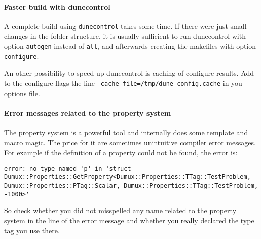\paragraph{Faster build with dunecontrol}
A complete build using \texttt{dunecontrol} takes some time. If there were just small changes in the folder structure, it is usually sufficient to run dunecontrol with option \texttt{autogen} instead of \texttt{all}, and afterwards creating the makefiles with option \texttt{configure}.

An other possibility to speed up dunecontrol is caching of configure results. Add to the configure flags the line \texttt{--cache-file=/tmp/dune-config.cache} in you options file.

\paragraph{Error messages related to the property system}
The property system is a powerful tool and internally does some template and macro magic. 
The price for it are sometimes unintuitive compiler error messages. For example if the
definition of a property could not be found, the error is:
\begin{lstlisting}[style=DumuxCode,numbers=none]
error: no type named 'p' in 'struct Dumux::Properties::GetProperty<Dumux::Properties::TTag::TestProblem, Dumux::Properties::PTag::Scalar, Dumux::Properties::TTag::TestProblem, -1000>'
\end{lstlisting}

So check whether you did not misspelled any name related to the property system in the 
line of the error message and whether you really declared the type tag you use there.
